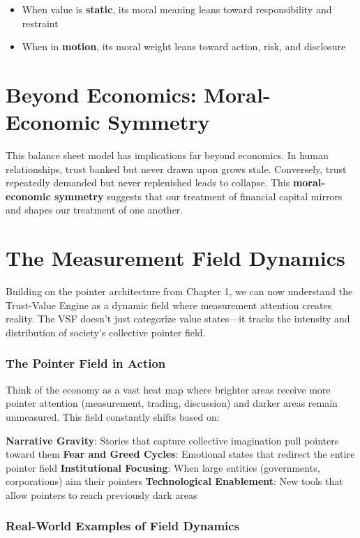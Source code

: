 \documentclass[11pt,oneside]{book}
\begin{document}
\begin{itemize}
\item When value is \textbf{static}, its moral meaning leans toward responsibility and restraint
\item When in \textbf{motion}, its moral weight leans toward action, risk, and disclosure
\end{itemize}

\section{Beyond Economics: Moral-Economic Symmetry}

This balance sheet model has implications far beyond economics. In human relationships, trust banked but never drawn upon grows stale. Conversely, trust repeatedly demanded but never replenished leads to collapse. This \textbf{moral-economic symmetry} suggests that our treatment of financial capital mirrors and shapes our treatment of one another.

\section{The Measurement Field Dynamics}

Building on the pointer architecture from Chapter 1, we can now understand the Trust-Value Engine as a dynamic field where measurement attention creates reality. The VSF doesn't just categorize value states—it tracks the intensity and distribution of society's collective pointer field.

\subsubsection{The Pointer Field in Action}

Think of the economy as a vast heat map where brighter areas receive more pointer attention (measurement, trading, discussion) and darker areas remain unmeasured. This field constantly shifts based on:

\textbf{Narrative Gravity}: Stories that capture collective imagination pull pointers toward them
\textbf{Fear and Greed Cycles}: Emotional states that redirect the entire pointer field
\textbf{Institutional Focusing}: When large entities (governments, corporations) aim their pointers
\textbf{Technological Enablement}: New tools that allow pointers to reach previously dark areas

\subsubsection{Real-World Examples of Field Dynamics}
\end{document}
